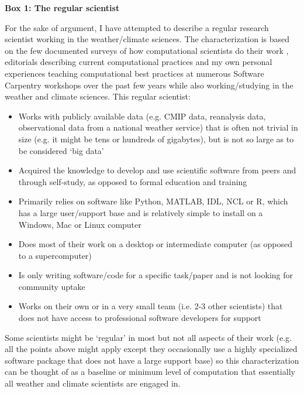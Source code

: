 \textbf{Box 1: The regular scientist}

For the sake of argument, I have attempted to describe a regular research scientist working in the weather/climate sciences. The characterization is based on the few documented surveys of how computational scientists do their work \citep{Hannay2009,Stodden2010}, editorials describing current computational practices \citep[e.g.][]{Easterbrook2014} and my own personal experiences teaching computational best practices at numerous Software Carpentry \citep{Wilson2014} workshops over the past few years while also working/studying in the weather and climate sciences. This regular scientist:
\begin{itemize}
\item Works with publicly available data (e.g. CMIP data, reanalysis data, observational data from a national weather service) that is often not trivial in size (e.g. it might be tens or hundreds of gigabytes), but is not so large as to be considered `big data' 
\item Acquired the knowledge to develop and use scientific software from peers and through self-study, as opposed to formal education and training
\item Primarily relies on software like Python, MATLAB, IDL, NCL or R, which has a large user/support base and is relatively simple to install on a Windows, Mac or Linux computer
\item Does most of their work on a desktop or intermediate computer (as opposed to a supercomputer)
\item Is only writing software/code for a specific task/paper and is not looking for community uptake  
\item Works on their own or in a very small team (i.e. 2-3 other scientists) that does not have access to professional software developers for support
\end{itemize}

Some scientists might be `regular' in most but not all aspects of their work (e.g. all the points above might apply except they occasionally use a highly specialized software package that does not have a large support base) so this characterization can be thought of as a baseline or minimum level of computation that essentially all weather and climate scientists are engaged in.  
